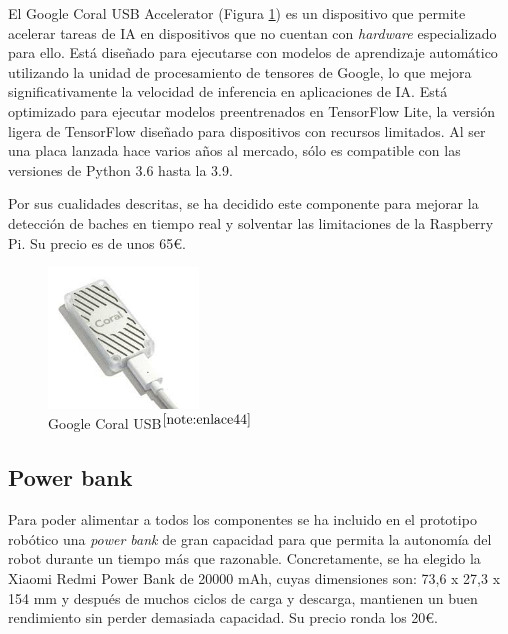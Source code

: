 El Google Coral USB Accelerator (Figura \ref{fig:googlecoral}) es un dispositivo que permite acelerar tareas de \ac{IA} en dispositivos que no cuentan con \textit{hardware} especializado para ello. Está diseñado para ejecutarse con modelos de aprendizaje automático utilizando la unidad de procesamiento de tensores de Google, lo que mejora significativamente la velocidad de inferencia en aplicaciones de \acs{IA}. Está optimizado para ejecutar modelos preentrenados en TensorFlow Lite, la versión ligera de TensorFlow diseñado para dispositivos con recursos limitados. Al ser una placa lanzada hace varios años al mercado, sólo es compatible con  las versiones de Python 3.6 hasta la 3.9.

Por sus cualidades descritas, se ha decidido este componente para mejorar la detección de baches en tiempo real y solventar las limitaciones de la Raspberry Pi. Su precio es de unos 65€.
 
\begin{figure} [h!]
	\begin{center}
		\includegraphics[width=4cm]{figs/googlecoral.png}
	\end{center}
	\caption{Google Coral USB$^{\ref{note:enlace44}}$} 
	\label{fig:googlecoral}
\end{figure}

\setcounter{footnote}{44} %

\subsection{Power bank}
\label{subsec:powerbank}

Para poder alimentar a todos los componentes se ha incluido en el prototipo robótico una \textit{power bank} de gran capacidad para que permita la autonomía del robot durante un tiempo más que razonable. Concretamente, se ha elegido la Xiaomi Redmi Power Bank de 20000 mAh, cuyas dimensiones son: 73,6 x 27,3 x 154 mm y después de muchos ciclos de carga y descarga, mantienen un buen rendimiento sin perder demasiada capacidad. Su precio ronda los 20€. %

